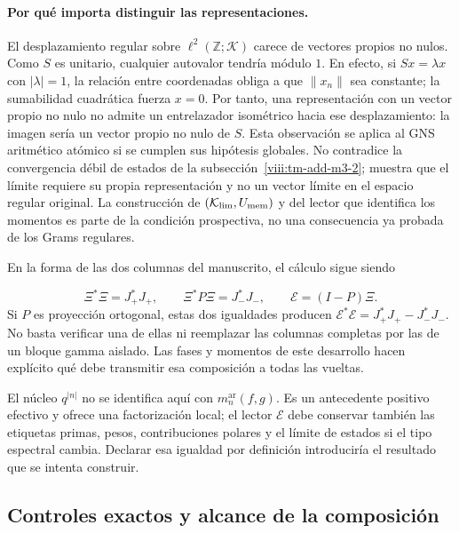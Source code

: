 \paragraph{Por qué importa distinguir las representaciones.}
El desplazamiento regular sobre \(\ell^2(\mathbb Z;\mathcal K)\)
carece de vectores propios no nulos. Como \(S\) es unitario, cualquier
autovalor tendría módulo \(1\). En efecto, si \(Sx=\lambda x\)
con \(|\lambda|=1\), la relación entre coordenadas obliga a que
\(\|x_n\|\) sea constante; la sumabilidad cuadrática fuerza \(x=0\).
Por tanto, una representación con un vector propio no nulo no admite
un entrelazador isométrico hacia ese desplazamiento: la imagen sería
un vector propio no nulo de \(S\). Esta observación se aplica al
GNS aritmético atómico si se cumplen sus hipótesis globales. No
contradice la convergencia débil de estados de la
subsección~\ref{viii:tm-add-m3-2}; muestra que el límite requiere su propia
representación y no un vector límite en el espacio regular original.
La construcción de \((\mathcal K_{\rm lim},U_{\rm mem})\) y del
lector que identifica los momentos es parte de la condición prospectiva,
no una consecuencia ya probada de los Grams regulares.

En la forma de las dos columnas del manuscrito, el cálculo sigue siendo

\[
\Xi^*\Xi=J_+^*J_+,\qquad
\Xi^*P\Xi=J_-^*J_-,\qquad
\mathcal E=(I-P)\Xi.
\]
Si \(P\) es proyección ortogonal, estas dos igualdades producen \(\mathcal E^*\mathcal E=J_+^*J_+-J_-^*J_-\). No basta verificar una de ellas ni reemplazar las columnas completas por las de un bloque gamma aislado. Las fases y momentos de este desarrollo hacen explícito qué debe transmitir esa composición a todas las vueltas.

El núcleo \(q^{|n|}\) no se identifica aquí con \(m_n^{\mathrm{ar}}(f,g)\). Es un antecedente positivo efectivo y ofrece una factorización local; el lector \(\mathcal E\) debe conservar también las etiquetas primas, pesos, contribuciones polares y el límite de estados si el tipo espectral cambia. Declarar esa igualdad por definición introduciría el resultado que se intenta construir.


\subsection{Controles exactos y alcance de la composición}
\label{viii:tm-add-m8}


